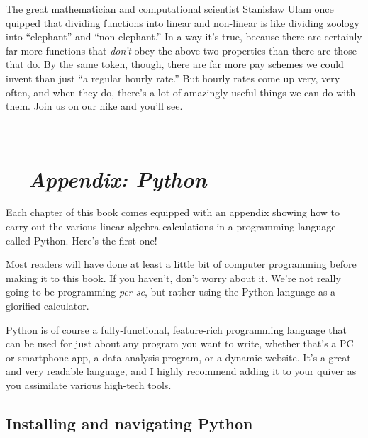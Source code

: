 
The great mathematician and computational scientist Stanis\l{}aw Ulam once
quipped that dividing functions into linear and non-linear is like dividing
zoology into ``elephant'' and ``non-elephant.'' In a way it's true, because
there are certainly far more functions that \textit{don't} obey the above two
properties than there are those that do. By the same token, though, there are
far more pay schemes we could invent than just ``a regular hourly rate.'' But
hourly rates come up very, very often, and when they do, there's a lot of
amazingly useful things we can do with them. Join us on our hike and you'll
see.

\bigskip
\hrulefill \\

\pagebreak

\section*{\faPython \ \ \textit{Appendix: Python}}


Each chapter of this book comes equipped with an appendix showing how to carry
out the various linear algebra calculations in a programming language called
Python. Here's the first one!

\medskip

Most readers will have done at least a little bit of computer programming
before making it to this book. If you haven't, don't worry about it. We're not
really going to be programming \textit{per se}, but rather using the Python
language as a glorified calculator.

Python is of course a fully-functional, feature-rich programming language that
can be used for just about any program you want to write, whether that's a PC
or smartphone app, a data analysis program, or a dynamic website. It's a great
and very readable language, and I highly recommend adding it to your quiver as
you assimilate various high-tech tools.

\subsection*{Installing and navigating Python}

